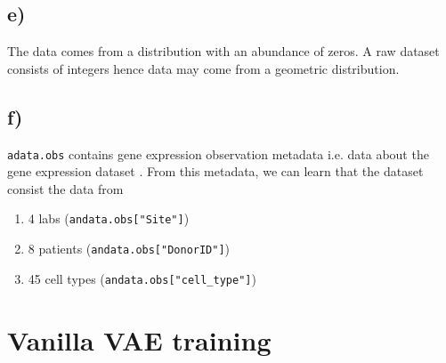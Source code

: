 \documentclass[a4paper,11pt]{article}
\begin{document}
\subsection*{e)}
The data comes from a distribution with an abundance of zeros. A raw dataset consists of integers hence data may come from a geometric distribution.
\subsection*{f)}
\texttt{adata.obs} contains gene expression observation metadata i.e. data about the gene expression dataset \cite{data}. From this metadata, we can learn that the dataset consist the data from
\begin{enumerate}
    \item 4 labs (\texttt{andata.obs["Site"]})
    \item 8 patients (\texttt{andata.obs["DonorID"]})
    \item 45 cell types (\texttt{andata.obs["cell\_type"]})
\end{enumerate}


\section{Vanilla VAE training}
\end{document}
